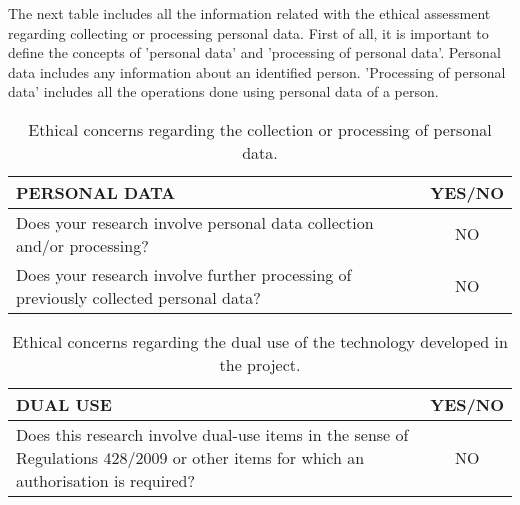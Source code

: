 The next table includes all the information related with the ethical assessment regarding collecting or processing personal data. First of all, it is important to define the concepts of 'personal data' and 'processing of personal data'. Personal data includes any information about an identified person. 'Processing of personal data' includes all the operations done using personal data of a person.\\

\begin{table}[H]
	\centering
	\begin{tabular}[H]{ p{12.6cm} c }
		
		\toprule[2pt]
		
		\textbf{PERSONAL DATA} & \textbf{YES/NO} \\
		
		\midrule[1.5pt]
		
		Does your research involve personal data collection and/or processing?\vspace{0.2cm} & NO \\
		
		Does your research involve further processing of previously collected personal data?\vspace{0.2cm} & NO \\
		
	    \bottomrule[2pt]
	    	
	\end{tabular}
	\caption[Ethics - Personal data]{Ethical concerns regarding the collection or processing of personal data.}
	\label{Ethics_personaldata}
\end{table}



\begin{table}[H]
	\centering
	\begin{tabular}[H]{ p{12.6cm} c }
		
		\toprule[2pt]
		
		\textbf{DUAL USE} & \textbf{YES/NO} \\
		
		\midrule[1.5pt]
		
		Does this research involve dual-use items in the sense of Regulations 428/2009 or other items for which an authorisation is required?\vspace{0.2cm} & NO\\
		
		\bottomrule[2pt]	
			
	\end{tabular}
	\caption[Ethics - Dual use]{Ethical concerns regarding the dual use of the technology developed in the project.}
	\label{Ethics_Dualuse}
\end{table}



